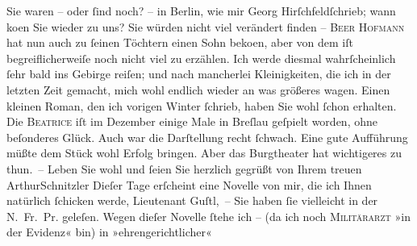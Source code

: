 \pstart
           Sie waren – oder ſind noch? – in Berlin, wie mir
                  Georg Hirſchfeldſchrieb; wann ko{\geminationm}en
               Sie wieder zu uns? Sie würden nicht viel verändert finden – \textsc{Beer Hofmann} hat nun auch zu ſeinen Töchtern einen Sohn beko{\geminationm}en, aber von dem iſt
               begreiflicherweiſe noch nicht viel zu erzählen. Ich werde diesmal wahrſcheinlich ſehr
               bald ins Gebirge reiſen; und nach mancherlei Kleinigkeiten, die ich in der letzten
               Zeit gemacht, mich wohl endlich wieder \introOben{}an\introOben{} was größeres {\pb}wagen. Einen kleinen Roman, den ich vorigen Winter{ }ſchrieb, haben Sie wohl ſchon erhalten. Die \textsc{Beatrice} iſt im Dezember einige Male in Breſlau geſpielt worden, ohne beſonderes Glück. Auch war die Darſtellung
               recht ſchwach. Eine gute Aufführung müßte dem Stück wohl Erfolg bringen. Aber das Burgtheater hat wichtigeres zu thun. –\pend
           \pstart Leben Sie wohl und ſeien Sie herzlich gegrüßt von Ihrem treuen
                  \spacefill\mbox{ArthurSchnitzler}\pend{}
\pstart
           \noindent{}{\pb}Dieſer Tage erſcheint eine Novelle von mir,
                  die ich Ihnen natürlich ſchicken werde, Lieutenant
                     Guſtl, – Sie haben ſie vielleicht in der N. Fr. Pr. geleſen. Wegen dieſer Novelle ſtehe ich – (da ich noch \textsc{Militärarzt} »in der Evidenz« bin) in »ehrengerichtlicher«
